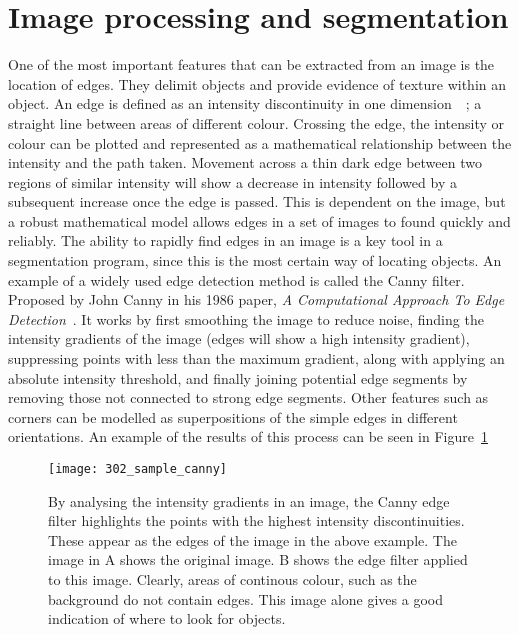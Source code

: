 \section{Image processing and segmentation}

One of the most important features that can be extracted from an image is the location of edges. They delimit objects and provide evidence of texture within an object. An edge is defined as an intensity discontinuity in one dimension~\cite{Yan:12}~\cite{Saluja:13}; a straight line between areas of different colour. Crossing the edge, the intensity or colour can be plotted and represented as a mathematical relationship between the intensity and the path taken. Movement across a thin dark edge between two regions of similar intensity will show a decrease in intensity followed by a subsequent increase once the edge is passed. This is dependent on the image, but a robust mathematical model allows edges in a set of images to found quickly and reliably. The ability to rapidly find edges in an image is a key tool in a segmentation program, since this is the most certain way of locating objects. An example of a widely used edge detection method is called the Canny filter. Proposed by John Canny in his 1986 paper, \emph{A Computational Approach To Edge Detection}~\cite{Canny:86}. It works by first smoothing the image to reduce noise, finding the intensity gradients of the image (edges will show a high intensity gradient), suppressing points with less than the maximum gradient, along with applying an absolute intensity threshold, and finally joining potential edge segments by removing those not connected to strong edge segments. Other features such as corners can be modelled as superpositions of the simple edges in different orientations. An example of the results of this process can be seen in Figure~\ref{fig:canny}

\begin{figure}[h!]
 \centering
 \texttt{[image: 302\_sample\_canny]}
 \caption[Example of the Canny edge filter]{
 	By analysing the intensity gradients in an image, the Canny edge filter highlights the points with the highest intensity discontinuities. These appear as the edges of the image in the above example. The image in A shows the original image. B shows the edge filter applied to this image. Clearly, areas of continous colour, such as the background do not contain edges. This image alone gives a good indication of where to look for objects.
 }
 \label{fig:canny}
\end{figure}


